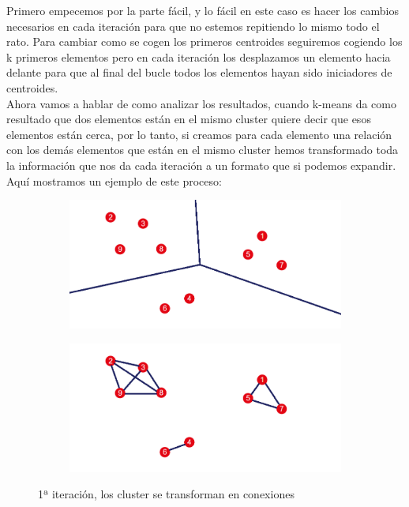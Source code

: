 \documentclass[12pt,a4paper]{article}
\begin{document}
			 Primero empecemos por la parte fácil, y lo fácil en este caso es hacer los cambios necesarios en cada iteración para que no estemos repitiendo lo mismo todo el rato. Para cambiar como se cogen los primeros centroides seguiremos cogiendo los k primeros elementos pero en cada iteración los desplazamos un elemento hacia delante para que al final del bucle todos los elementos hayan sido iniciadores de centroides.\\
			 Ahora vamos a hablar de como analizar los resultados, cuando k-means da como resultado que dos elementos están en el mismo cluster quiere decir que esos elementos están cerca, por lo tanto, si creamos para cada elemento una relación con los demás elementos que están en el mismo cluster hemos transformado toda la información que nos da cada iteración a un formato que si podemos expandir.\\
			 Aquí mostramos un ejemplo de este proceso:\\
\begin{figure}[H]
\centering
\begin{subfigure}{.5\textwidth}
  \centering
  \includegraphics[width=.9\linewidth]{cluster 1}
  \label{fig:sub1}
\end{subfigure}%
\begin{subfigure}{.5\textwidth}
  \centering
  \includegraphics[width=.9\linewidth]{grafo cluster 1}
  \label{fig:sub2}
\end{subfigure}
\caption{1ª iteración, los cluster se transforman en conexiones}
\label{fig:test}
\end{figure}
\end{document}
